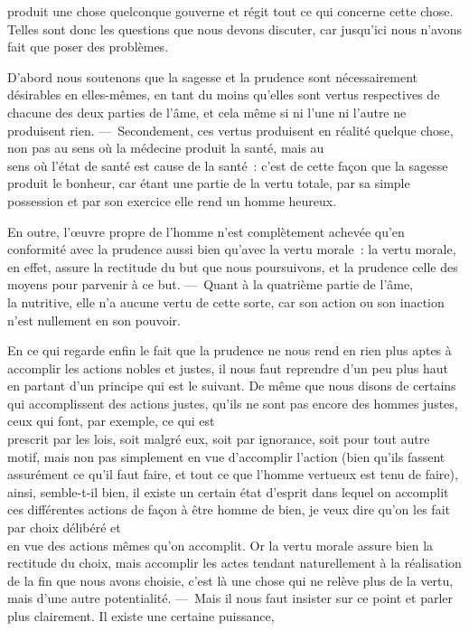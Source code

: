 \documentclass[french,twoside]{book} %
\begin{document}
produit une chose quelconque gouverne et régit tout ce qui concerne cette chose. Telles sont donc les questions que nous devons discuter, car jusqu’ici nous n’avons fait que poser des problèmes.\par
 D’abord nous soutenons que la sagesse et la prudence sont nécessairement désirables en elles-mêmes, en tant du moins qu’elles sont vertus respectives de chacune des deux parties de l’âme, et cela même si ni l’une ni l’autre ne produisent rien. — Secondement, ces vertus produisent en réalité quelque chose, non pas au sens où la médecine produit la santé, mais au \\
sens où l’état de santé est cause de la santé : c’est de cette façon que la sagesse produit le bonheur, car étant une partie de la vertu totale, par sa simple possession et par son exercice elle rend un homme heureux.\par
En outre, l’œuvre propre de l’homme n’est complètement achevée qu’en conformité avec la prudence aussi bien qu’avec la vertu morale : la vertu morale, en effet, assure la rectitude du but que nous poursuivons, et la prudence celle des moyens pour parvenir à ce but. — Quant à la quatrième partie de l’âme, \\
la nutritive, elle n’a aucune vertu de cette sorte, car son action ou son inaction n’est nullement en son pouvoir.\par
En ce qui regarde enfin le fait que la prudence ne nous rend en rien plus aptes à accomplir les actions nobles et justes, il nous faut reprendre d’un peu plus haut en partant d’un principe qui est le suivant. De même que nous disons de certains qui accomplissent des actions justes, qu’ils ne sont pas encore des hommes justes, ceux qui font, par exemple, ce qui est \\
prescrit par les lois, soit malgré eux, soit par ignorance, soit pour tout autre motif, mais non pas simplement en vue d’accomplir l’action (bien qu’ils fassent assurément ce qu’il faut faire, et tout ce que l’homme vertueux est tenu de faire), ainsi, semble-t-il bien, il existe un certain état d’esprit dans lequel on accomplit ces différentes actions de façon à être homme de bien, je veux dire qu’on les fait par choix délibéré et \\
en vue des actions mêmes qu’on accomplit. Or la vertu morale assure bien la rectitude du choix, mais accomplir les actes tendant naturellement à la réalisation de la fin que nous avons choisie, c’est là une chose qui ne relève plus de la vertu, mais d’une autre potentialité. — Mais il nous faut insister sur ce point et parler plus clairement. Il existe une certaine puissance, \\
\end{document}
